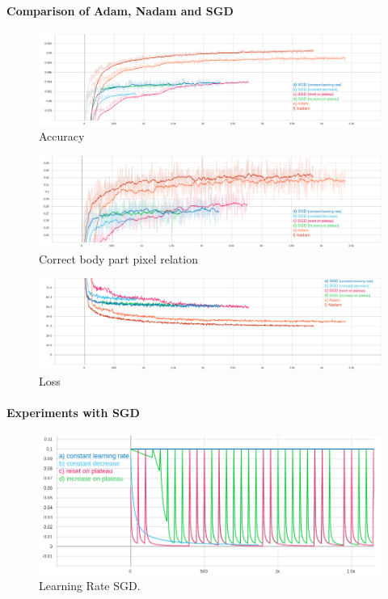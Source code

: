 \paragraph{Comparison of Adam, Nadam and SGD}
\begin{figure}[H]
    \centering
    \includegraphics[width=\textwidth,height=\textheight,keepaspectratio]{img/accuracy_all.png}
    \decoRule
    \caption[Accuracy]{Accuracy}
    \label{fig:accuracy}
\end{figure}
\begin{figure}[H]
    \centering
    \includegraphics[width=\textwidth,height=\textheight,keepaspectratio]{img/accuracy_body_part_all.png}
    \decoRule
    \caption[Correct BPR]{Correct body part pixel relation}
    \label{fig:acc-bp}
\end{figure}
\begin{figure}[H]
    \centering
    \includegraphics[width=\textwidth,height=\textheight,keepaspectratio]{img/loss_all.png}
    \decoRule
    \caption[loss]{Loss}
    \label{fig:loss}
\end{figure}

\paragraph{Experiments with SGD}
\begin{figure}[H]
    \centering
    \includegraphics[width=\textwidth,height=\textheight,keepaspectratio]{img/learning_rate2.png}
    \decoRule
    \caption[Learning Rate SGD]{Learning Rate SGD.}
    \label{fig:sgd-learning-rate}
\end{figure}

